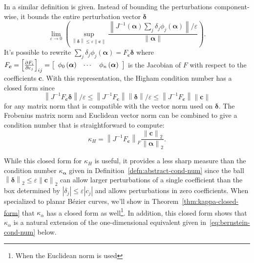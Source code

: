 \documentclass[3p, authoryear, square]{elsarticle}
\theoremstyle{definition}
\newcommand{\eps}{\varepsilon}
\begin{document}
In \cite[Chapter~25, Section 25.4]{Higham2002} a similar definition is
given. Instead of bounding the perturbations component-wise, it bounds
the entire perturbation vector \(\bm{\delta}\)
\begin{equation}
  \lim_{\eps \to 0} \left(\sup_{\left \lVert \bm{\delta} \right \rVert \leq
  \eps \left \lVert \bm{c} \right \rVert} \frac{\left \lVert
  J^{-1}\left(\bm{\alpha}\right) \sum_j \delta_j
  \phi_j\left(\bm{\alpha}\right) \right \rVert / \eps}{
  \left \lVert \bm{\alpha} \right \rVert}\right).
\end{equation}
It's possible to rewrite \(\sum_j \delta_j \phi_j\left(\bm{\alpha}\right) =
F_{\bm{c}} \bm{\delta}\) where \(F_{\bm{c}} =
\left[\frac{\partial F_i}{\partial c_j}\right]_{ij} =
\left[\begin{array}{c c c} \phi_0\left(\bm{\alpha}\right) & \cdots &
\phi_n\left(\bm{\alpha}\right) \end{array}\right]\) is the Jacobian of \(F\)
with respect to the coefficients \(\bm{c}\). With this representation, the
Higham condition number has a closed form since
\begin{equation}
  \left \lVert
  J^{-1} F_{\bm{c}} \bm{\delta} \right \rVert / \eps \leq
  \left \lVert J^{-1} F_{\bm{c}} \right \rVert \left \lVert \bm{\delta} \right
  \rVert / \eps \leq \left \lVert J^{-1} F_{\bm{c}} \right \rVert \left \lVert
  \bm{c} \right \rVert
\end{equation}
for any matrix norm that is compatible with the vector norm used on
\(\bm{\delta}\). The Frobenius matrix norm and Euclidean vector norm can be
combined to give a condition number that is straightforward to compute:
\begin{equation}
  \kappa_H = \left \lVert J^{-1} F_{\bm{c}} \right \rVert_F
  \frac{\left \lVert \bm{c}
  \right \rVert_2}{\left \lVert \bm{\alpha} \right \rVert_2}.
\end{equation}

While this closed form for \(\kappa_H\) is useful, it provides a less sharp
measure than the condition number \(\kappa_{\bm{\alpha}}\) given in
Definition~\ref{defn:abstract-cond-num} since the ball \(\left \lVert
\bm{\delta} \right \rVert_2 \leq \eps \left \lVert \bm{c} \right \rVert_2\)
can allow larger perturbations of a single coefficient than the box determined
by \(\left|\delta_j\right| \leq \eps \left|c_j\right|\) and allows
perturbations in zero coefficients.
When specialized to planar B\'{e}zier curves, we'll show in
Theorem~\ref{thm:kappa-closed-form} that \(\kappa_{\alpha}\) has a closed form
as well\footnote{When the Euclidean norm is used}. In addition, this closed
form shows that \(\kappa_{\alpha}\) is a natural extension of the
one-dimensional equivalent given in~\eqref{eq:bernstein-cond-num} below.
\end{document}

